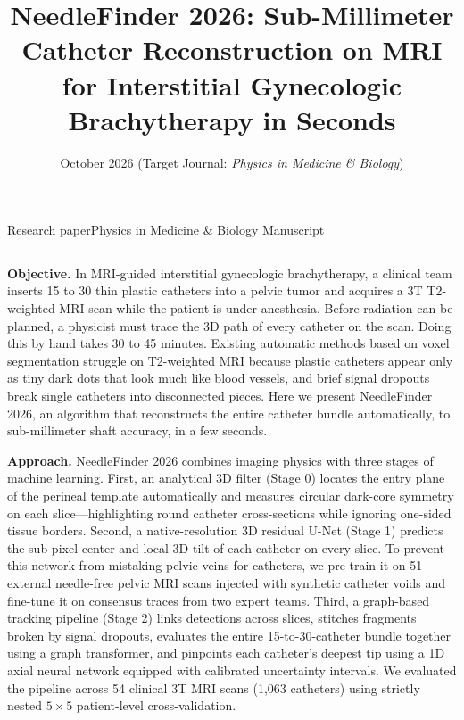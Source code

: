 \documentclass[
  11pt,
]{article}
\title{NeedleFinder 2026: Sub-Millimeter Catheter Reconstruction on MRI
for Interstitial Gynecologic Brachytherapy in Seconds}
\author{}
\date{October 2026 (Target Journal: \emph{Physics in Medicine \&
Biology})}
\makeatletter
\newcommand{\nfcaps}[1]{{\nfcapsfont #1}}
\renewcommand{\maketitle}{%
  \thispagestyle{plain}%
  \begingroup
  \def\and{ }%
  \null\vspace*{-1.5\baselineskip}%
  {\raggedright
   {\nfcaps{\footnotesize Research paper}\hfill\nfcaps{\footnotesize Physics in Medicine \& Biology \textperiodcentered{} Manuscript}\par}%
   \vspace{0.35\baselineskip}%
   {\color{nfrule}\rule{\linewidth}{0.4pt}\par}%
   \vspace{2.2\baselineskip}%
   {\fontsize{21}{25.5}\selectfont\@title\par}%
   \ifx\@author\@empty\else
     \vspace{1.4\baselineskip}%
     {\large\@author\par}%
   \fi
   \vspace{0.8\baselineskip}%
   {\small\itshape\color{nfgrey}\@date\par}%
  }%
  \vspace{2.2\baselineskip}%
  \endgroup}
\renewenvironment{abstract}
  {\par\noindent{\small\nfcaps{Abstract}}\par\vspace{0.4\baselineskip}%
   \begingroup\small\setlength{\parindent}{0pt}\setlength{\parskip}{0.45\baselineskip}}
  {\par\endgroup
   \vspace{0.9\baselineskip}%
   \noindent{\color{nfrule}\rule{\linewidth}{0.4pt}}\par\vspace{0.4\baselineskip}}
\makeatother
\begin{document}
\maketitle
\begin{abstract}
\textbf{Objective.} In MRI-guided interstitial gynecologic
brachytherapy, a clinical team inserts 15 to 30 thin plastic catheters
into a pelvic tumor and acquires a 3T T2-weighted MRI scan while the
patient is under anesthesia. Before radiation can be planned, a
physicist must trace the 3D path of every catheter on the scan. Doing
this by hand takes 30 to 45 minutes. Existing automatic methods based on
voxel segmentation struggle on T2-weighted MRI because plastic catheters
appear only as tiny dark dots that look much like blood vessels, and
brief signal dropouts break single catheters into disconnected pieces.
Here we present NeedleFinder 2026, an algorithm that reconstructs the
entire catheter bundle automatically, to sub-millimeter shaft accuracy,
in a few seconds.

\textbf{Approach.} NeedleFinder 2026 combines imaging physics with three
stages of machine learning. First, an analytical 3D filter (Stage 0)
locates the entry plane of the perineal template automatically and
measures circular dark-core symmetry on each slice---highlighting round
catheter cross-sections while ignoring one-sided tissue borders. Second,
a native-resolution 3D residual U-Net (Stage 1) predicts the sub-pixel
center and local 3D tilt of each catheter on every slice. To prevent
this network from mistaking pelvic veins for catheters, we pre-train it
on 51 external needle-free pelvic MRI scans injected with synthetic
catheter voids and fine-tune it on consensus traces from two expert
teams. Third, a graph-based tracking pipeline (Stage 2) links detections
across slices, stitches fragments broken by signal dropouts, evaluates
the entire 15-to-30-catheter bundle together using a graph transformer,
and pinpoints each catheter's deepest tip using a 1D axial neural
network equipped with calibrated uncertainty intervals. We evaluated the
pipeline across 54 clinical 3T MRI scans (1,063 catheters) using
strictly nested \(5 \times 5\) patient-level cross-validation.


\end{abstract}
\end{document}
